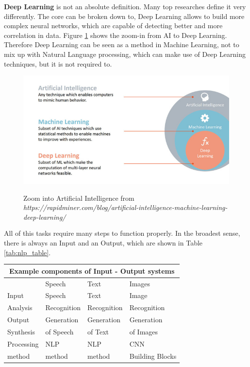 \textbf{Deep Learning} is not an absolute definition. Many top researches define it very differently. The core can be broken down to, Deep Learning allows to build more complex neural networks, which are capable of detecting better and more correlation in data. Figure \ref{ai} shows the zoom-in from AI to Deep Learning. Therefore Deep Learning can be seen as a method in Machine Learning, not to mix up with Natural Language processing, which can make use of Deep Learning techniques, but it is not required to.

\begin{figure}
	\begin{center}
		\includegraphics[width=5.5in]{photos/ai_ml_dl.jpg}\\
		\caption{Zoom into Artificial Intelligence from \textit{https://rapidminer.com/blog/artificial-intelligence-machine-learning-deep-learning/}}\label{ai}
	\end{center}
\end{figure}

All of this tasks require many steps to function properly. In the broadest sense, there is always an Input and an Output, which are shown in Table \ref{tab:nlp_table}.

\begin{center} 
	\begin{tabular}{ |p{3cm}||p{3cm}|p{3cm}|p{3cm}|}
		\hline
		\multicolumn{4}{|c|}{\textbf{Example components of Input - Output systems}}\\ \hline\hline
		&Speech &Text &Images \\ \hline
		Input &Speech &Text &Image \\
		Analysis &Recognition  &Recognition     &Recognition \\ \hline \hline
		Output &Generation &\cellcolor[HTML]{F3E687}Generation &Generation \\
		Synthesis &of Speech & \cellcolor[HTML]{F3E687}of Text &of Images \\ \hline \hline
		Processing &NLP &\cellcolor[HTML]{7ebfd3}NLP &CNN \\
		method &method  &\cellcolor[HTML]{7ebfd3}method     &Building Blocks \\ \hline
	\end{tabular}
	\label{tab:nlp_table}
\end{center}


